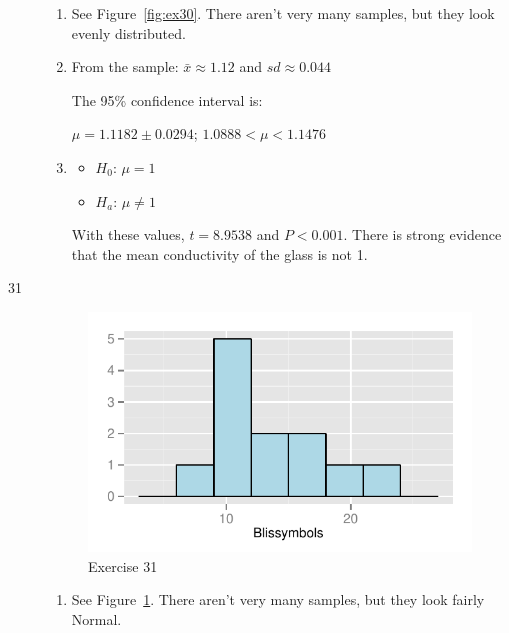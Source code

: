 \documentclass[letterpaper, landscape]{exam}
\begin{document}
\begin{description}
        \begin{enumerate}[label = (\alph*)]
          \item See Figure~\ref{fig:ex30}. There aren't very many samples, but
            they look evenly distributed.

          \item From the sample: $\bar{x} \approx 1.12$ and $sd \approx 0.044$

            The 95\% confidence interval is:
            
            $\mu = 1.1182 \pm 0.0294$; $1.0888 < \mu < 1.1476$

          \item 
            \begin{itemize}[parsep=0pt,label={}]
              \item $H_0$: $\mu = 1$
              \item $H_a$: $\mu \ne 1$
            \end{itemize}

            With these values, $t = 8.9538$ and $P < 0.001$. There is strong
            evidence that the mean conductivity of the glass is not 1.

        \end{enumerate}

      \item[31]
        \begin{figure}[H]
          \centering
          \includegraphics[scale = 1.0]{figures/ex31.pdf}
          \caption{Exercise 31}\label{fig:ex31}
        \end{figure}
        
        \begin{enumerate}[label = (\alph*)]
          \item See Figure~\ref{fig:ex31}. There aren't very many samples, but
            they look fairly Normal.


\end{enumerate}
\end{description}
\end{document}
